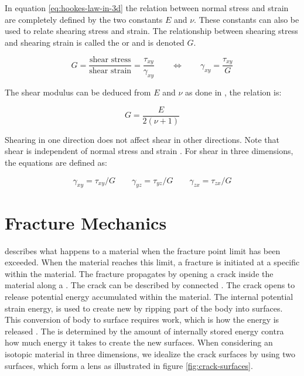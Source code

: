In equation \eqref{eq:hookes-law-in-3d} the relation between normal
stress and strain are completely defined by the two constants $E$ and
$\nu$. These constants can also be used to relate shearing stress and
strain.
%
%
The relationship between shearing stress and shearing strain is 
called the  or  and is
denoted $G$.

\begin{equation}
\label{eq:shearing_stress_over_shearing_strain}
  G 
  = \frac{\mbox{shear stress}}{\mbox{shear strain}}
  = \frac{\tau_{xy}}{\gamma_{xy}}
  \qquad \Leftrightarrow \qquad
  \gamma_{xy} = \frac{\tau_{xy}}{G}
\end{equation}

The shear modulus can be deduced from $E$ and $\nu$ as done in
, the relation is:

\begin{equation}
\label{eq:EG-relation}
  G = \frac{E}{2(\nu+1)}
\end{equation}

Shearing in one direction does not affect shear in other
directions. Note that shear is independent of normal stress and
strain . For shear in three
dimensions, the equations are defined as:

\begin{equation}
\label{eq:3d-shear-ss-relation}
  \gamma_{xy} = \tau_{xy} / G
  \qquad
  \gamma_{yz} = \tau_{yz} / G
  \qquad
  \gamma_{zx} = \tau_{zx} / G
\end{equation}


\section{Fracture Mechanics}
\label{sec:fracture-mechanics}
 describes what happens to a material when
the fracture point limit has been exceeded.
%
When the material reaches this limit, a fracture is initiated at a
specific  within the material. The fracture
propagates by opening a crack inside the material along a
. The crack can be described by connected
. The crack opens to release
potential energy accumulated within the material. The internal potential
strain energy, is used to create
new  by ripping part of the body into surfaces.
This conversion of body to surface requires work, which is
how the energy is released .
%
The  is determined by the amount of internally
stored energy contra how much energy it takes to create the new surfaces.
%
When considering an isotopic material in three dimensions, we idealize
the crack surfaces by using two surfaces, which form a lens as
illustrated in figure \vref{fig:crack-surfaces}.

